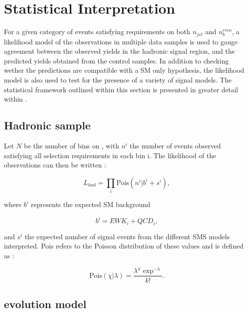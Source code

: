 \section{Statistical Interpretation}
\label{sec:statframework}

For a given category of events satisfying requirements on both $n_{jet}$ and $n_{b}^{reco}$, a likelihood model of the observations in multiple data samples is used to gauge agreement between the observed yields in the hadronic signal region, and the predicted yields obtained from the control samples. In addition to checking wether the predictions are compatible with a \ac{SM} only hypothesis, the likelihood model is also used to test for the presence of a variety of signal models. The statistical framework outlined within this section is presented in greater detail within \cite{Laird:2012mla}.

\subsection{Hadronic sample}

Let $N$ be the number of bins on \theht, with $n^{i}$ the number of events observed satisfying all selection requirements in each \theht bin i. The likelihood of the observations can then be written :

\begin{equation}
L_{had} =   \prod_{i}\text{Pois}(n^{i}\rvert b^{i} + s^{i}),
\end{equation}

where $b^{i}$ represents the expected \ac{SM} background 

\begin{equation}
\label{eq:totbacksum}
b^{i} = EWK_{i} + QCD_{i},
\end{equation}

and $s^{i}$ the expected number of signal events from the different \ac{SMS} models interpreted. Pois refers to the Poisson distribution of these values and is defined as :

\begin{equation}
\text{Pois}(\chi\rvert\lambda) = \frac{\lambda^{\chi}\exp^{-\lambda}}{k!}.
\end{equation}
 
\subsection{\theht evolution model}
\label{subsec:htevolution}

